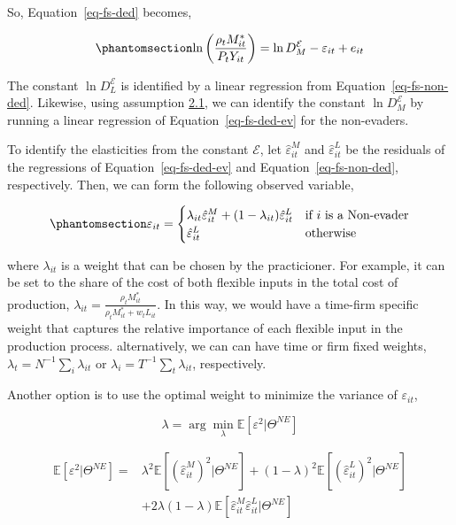 \documentclass[
  12pt]{article}
\theoremstyle{definition}
\theoremstyle{remark}
\begin{document}
So, Equation~\ref{eq-fs-ded} becomes,

\begin{equation}\phantomsection\label{eq-fs-ded-ev}{
 \ln\left(\frac{\rho_t M^*_{it}}{P_t Y_{it}}\right)=\ln D^{\mathcal{E}}_M -\varepsilon_{it}+e_{it}
}\end{equation}

The constant \(\ln D^{\mathcal{E}}_L\) is identified by a linear
regression from Equation~\ref{eq-fs-non-ded}. Likewise, using assumption
\hyperref[ass-non-ev]{2.1}, we can identify the constant
\(\ln D^{\mathcal{E}}_M\) by running a linear regression of
Equation~\ref{eq-fs-ded-ev} for the non-evaders.

To identify the elasticities from the constant \(\mathcal{E}\), let
\(\hat\varepsilon^M_{it}\) and \(\hat\varepsilon^L_{it}\) be the
residuals of the regressions of Equation~\ref{eq-fs-ded-ev} and
Equation~\ref{eq-fs-non-ded}, respectively. Then, we can form the
following observed variable,

\begin{equation}\phantomsection\label{eq-wgt-eps}{
\varepsilon_{it}= \begin{cases}
\lambda_{it} \hat \varepsilon^M_{it} + (1-\lambda_{it}) \hat \varepsilon^L_{it} & \text{if $i$ is a Non-evader}\\
\hat \varepsilon^L_{it} & \text{otherwise}
\end{cases}
}\end{equation}

where \(\lambda_{it}\) is a weight that can be chosen by the
practicioner. For example, it can be set to the share of the cost of
both flexible inputs in the total cost of production,
\(\lambda_{it}=\frac{\rho_t M^*_{it}}{\rho_t M^*_{it}+w_t L_{it}}\). In
this way, we would have a time-firm specific weight that captures the
relative importance of each flexible input in the production process.
alternatively, we can can have time or firm fixed weights,
\(\lambda_t=N^{-1}\sum_i\lambda_{it}\) or
\(\lambda_i=T^{-1}\sum_t\lambda_{it}\), respectively.

Another option is to use the optimal weight to minimize the variance of
\(\varepsilon_{it}\),

\[
\lambda = \arg\min_{\lambda} \mathbb{E}\left[\varepsilon^2|\Theta^{NE}\right]
\]

\[
\begin{aligned}
\mathbb{E}\left[\varepsilon^2|\Theta^{NE}\right] =&\lambda^2 \mathbb{E}\left[\left(\hat \varepsilon^M_{it}\right)^2|\Theta^{NE}\right] + (1-\lambda)^2 \mathbb{E}\left[\left(\hat \varepsilon^L_{it}\right)^2|\Theta^{NE}\right]\\
&+ 2\lambda(1-\lambda)\mathbb{E}\left[\hat \varepsilon^M_{it}\hat \varepsilon^L_{it}|\Theta^{NE}\right]
\end{aligned}
\]
\end{document}
